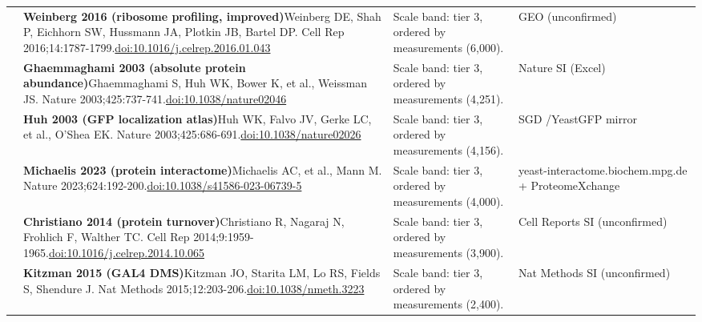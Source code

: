 \begin{landscape}
\begin{longtable}{@{}r@{\hspace{4pt}} L{86mm} L{92mm} L{62mm}@{}}
 & \textbf{Weinberg 2016 (ribosome profiling, improved)}\newline Weinberg DE, Shah P, Eichhorn SW, Hussmann JA, Plotkin JB, Bartel DP. Cell Rep 2016;14:1787-1799.\newline \href{https://doi.org/10.1016/j.celrep.2016.01.043}{doi:10.1016/\allowbreak j.celrep.2016.01.043} & Scale band: tier 3, ordered by measurements (6,000). & GEO (unconfirmed) \\
 & \textbf{Ghaemmaghami 2003 (absolute protein abundance)}\newline Ghaemmaghami S, Huh WK, Bower K, et al., Weissman JS. Nature 2003;425:737-741.\newline \href{https://doi.org/10.1038/nature02046}{doi:10.1038/\allowbreak nature02046} & Scale band: tier 3, ordered by measurements (4,251). & Nature SI (Excel) \\
 & \textbf{Huh 2003 (GFP localization atlas)}\newline Huh WK, Falvo JV, Gerke LC, et al., O'Shea EK. Nature 2003;425:686-691.\newline \href{https://doi.org/10.1038/nature02026}{doi:10.1038/\allowbreak nature02026} & Scale band: tier 3, ordered by measurements (4,156). & SGD /\allowbreak  YeastGFP mirror \\
 & \textbf{Michaelis 2023 (protein interactome)}\newline Michaelis AC, et al., Mann M. Nature 2023;624:192-200.\newline \href{https://doi.org/10.1038/s41586-023-06739-5}{doi:10.1038/\allowbreak s41586-023-06739-5} & Scale band: tier 3, ordered by measurements (4,000). & yeast-interactome.biochem.mpg.de + ProteomeXchange \\
 & \textbf{Christiano 2014 (protein turnover)}\newline Christiano R, Nagaraj N, Frohlich F, Walther TC. Cell Rep 2014;9:1959-1965.\newline \href{https://doi.org/10.1016/j.celrep.2014.10.065}{doi:10.1016/\allowbreak j.celrep.2014.10.065} & Scale band: tier 3, ordered by measurements (3,900). & Cell Reports SI (unconfirmed) \\
 & \textbf{Kitzman 2015 (GAL4 DMS)}\newline Kitzman JO, Starita LM, Lo RS, Fields S, Shendure J. Nat Methods 2015;12:203-206.\newline \href{https://doi.org/10.1038/nmeth.3223}{doi:10.1038/\allowbreak nmeth.3223} & Scale band: tier 3, ordered by measurements (2,400). & Nat Methods SI (unconfirmed) \\

\end{longtable}
\end{landscape}
